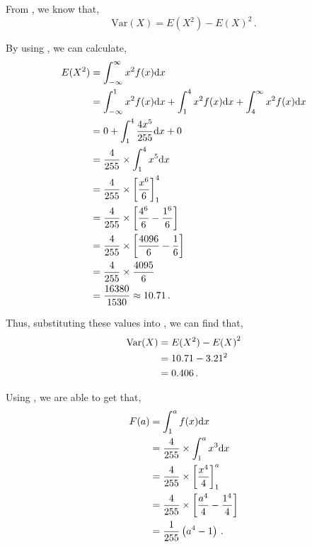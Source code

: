 \begin{subquestions}
\begin{subsubquestions}
From , we know that,
\begin{equation}
	\text{Var}(X) = E(X^2) - {E(X)}^2 \,. \label{2005:q3:CRVar}
\end{equation}

By using , we can calculate,
\begin{align}
	E(X^2) & = \int_{-\infty}^{\infty} x^2 f(x)\mathrm{d}x \nonumber \\
	& = \int_{-\infty}^{1} x^2 f(x)\mathrm{d}x+\int_{1}^{4} x^2 f(x)\mathrm{d}x+\int_{4}^{\infty} x^2 f(x)\mathrm{d}x \nonumber \\
	& = 0 + \int_{1}^{4} \frac{4x^5}{255} \mathrm{d}x + 0 \nonumber \\
	& = \frac{4}{255} \times \int_{1}^{4} x^5 \mathrm{d}x \nonumber \\
	& = \frac{4}{255} \times \left[\frac{x^6}{6}\right]^4_1 \nonumber \\
	& = \frac{4}{255} \times \left[\frac{4^6}{6} - \frac{1^6}{6}\right] \nonumber \\
	& = \frac{4}{255} \times \left[\frac{4096}{6} - \frac{1}{6}\right] \nonumber \\
	& = \frac{4}{255} \times \frac{4095}{6} \nonumber \\
	& = \frac{16380}{1530} \approx 10.71 \,.
\end{align}	

Thus, substituting these values into , we can find that,
\begin{align}
\text{Var}(X) & = E(X^2) - {E(X)}^2 \nonumber \\
	& = 10.71 - 3.21^2 \nonumber \\
	& = 0.406 \,.	
\end{align}

\end{subsubquestions}
	

\subquestion

\begin{subsubquestions}
	
\subsubquestion

Using , we are able to get that,
\begin{align}
	F(a) & = \int_{1}^{a} f(x)\mathrm{d}x \nonumber \\
	     & = \frac{4}{255} \times \int_{1}^{a} x^3\mathrm{d}x \nonumber \\
	     & = \frac{4}{255} \times \left[\frac{x^4}{4}\right]^a_1 \nonumber \\
	     & = \frac{4}{255} \times \left[\frac{a^4}{4} - \frac{1^4}{4} \right] \nonumber \\
	     & = \frac{1}{255}\left(a^4 - 1 \right) \,.
\end{align}
	

\end{subsubquestions}
\end{subquestions}

